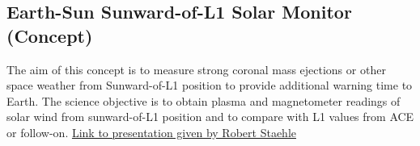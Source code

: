 \subsection{Earth-Sun Sunward-of-L1 Solar Monitor (Concept)}
The aim of this concept is to measure strong coronal mass ejections or other space weather from Sunward-of-L1 position to provide additional warning time to Earth. The science objective is to obtain plasma and magnetometer readings of solar wind from sunward-of-L1 position and to compare with L1 values from ACE or follow-on. \href{http://kiss.caltech.edu/cosponsored/cubesat2012/presentations/staehle-interplanetary-cubesat-missions.pdf}{Link to presentation given by Robert Staehle}
